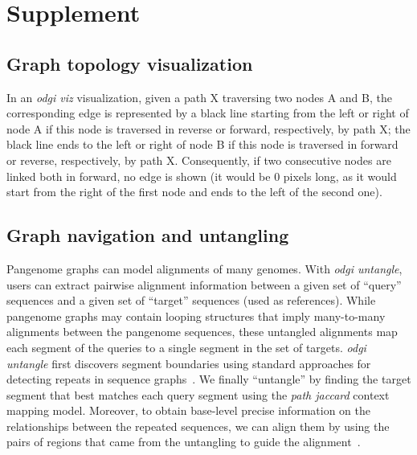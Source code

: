 \documentclass{bioinfo}
\newcommand{\beginsupplement}{%
    \renewcommand{\thesection}{S}
	\setcounter{table}{0}
	\renewcommand{\thetable}{S\arabic{table}}%
	\setcounter{figure}{0}
	\renewcommand{\thefigure}{S\arabic{figure}}%
}
\begin{document}
\clearpage
\setcounter{page}{1}

\beginsupplement

\section{Supplement}

\subsection{Graph topology visualization}
\label{sec:supp_visualization}
In an \textit{odgi viz} visualization, given a path X traversing two nodes A and B, the corresponding edge is represented by a black line starting from the left or right of node A if this node is traversed in reverse or forward, respectively, by path X;
the black line ends to the left or right of node B if this node is traversed in forward or reverse, respectively, by path X.
Consequently, if two consecutive nodes are linked both in forward, no edge is shown (it would be 0 pixels long, as it would start from the right of the first node and ends to the left of the second one).

\subsection{Graph navigation and untangling}
\label{sec:supp_navigation}
Pangenome graphs can model alignments of many genomes.
With \textit{odgi untangle}, users can extract pairwise alignment information between a given set of ``query'' sequences and a given set of ``target'' sequences (used as references).
While pangenome graphs may contain looping structures that imply many-to-many alignments between the pangenome sequences, these untangled alignments map each segment of the queries to a single segment in the set of targets.
\textit{odgi untangle} first discovers segment boundaries using standard approaches for detecting repeats in sequence graphs~\citep{Pevzner_2004}.
We finally ``untangle'' by finding the target segment that best matches each query segment using the \textit{path jaccard} context mapping model.
Moreover, to obtain base-level precise information on the relationships between the repeated sequences, we can align them by using the pairs of regions that came from the untangling to guide the alignment~\citep{wfmash}.
\end{document}
